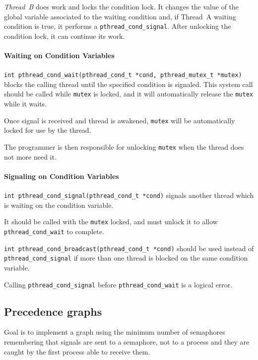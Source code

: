 \textit{Thread~B} does work and locks the condition lock. It changes the value of the global variable associated to the waiting condition and, if Thread~A waiting condition is true, it performs a \texttt{pthread\_cond\_signal}. After unlocking the condition lock, it can continue its work.

\paragraph{Waiting on Condition Variables}
\begin{description}
\item \texttt{int pthread\_cond\_wait(pthread\_cond\_t *cond, \newline pthread\_mutex\_t *mutex)} blocks the calling thread until the specified condition is signaled. This system call should be called while \texttt{mutex} is locked, and it will automatically release the \texttt{mutex} while it waits.

Once signal is received and thread is awakened, \texttt{mutex} will be automatically locked for use by the thread.

The programmer is then responsible for unlocking \texttt{mutex} when the thread does not more need it.
\end{description}

\paragraph{Signaling on Condition Variables}
\begin{description}
\item \texttt{int pthread\_cond\_signal(pthread\_cond\_t *cond)} signals another thread which is waiting on the condition variable.

It should be called with the \texttt{mutex} locked, and must unlock it to allow \texttt{pthread\_cond\_wait} to complete.

\item \texttt{int pthread\_cond\_broadcast(pthread\_cond\_t *cond)} should be used instead of \texttt{pthread\_cond\_signal} if more than one thread is blocked on the same condition variable.
\end{description}
Calling \texttt{pthread\_cond\_signal} before \texttt{pthread\_cond\_wait} is a logical error.

\subsection{Precedence graphs}
Goal is to implement a graph using the minimum number of semaphores remembering that signals are sent to a semaphore, not to a process and they are caught by the first process able to receive them.

